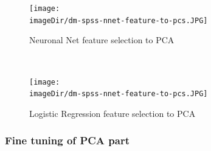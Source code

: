 \documentclass[11pt, a4paper, twoside]{article}   	%
\newcommand{\imageDir}{./images/}
\begin{document}
\begin{figure}[h]
\centering
\texttt{[image: \\imageDir/dm-spss-nnet-feature-to-pcs.JPG]}
\caption{Neuronal Net feature selection to PCA}
\end{figure}
\ \newpage

\begin{figure}[h]
\centering
\texttt{[image: \\imageDir/dm-spss-nnet-feature-to-pcs.JPG]}
\caption{Logistic Regression feature selection to PCA}
\end{figure}

\subsubsection{Fine tuning of PCA part}
\end{document}
